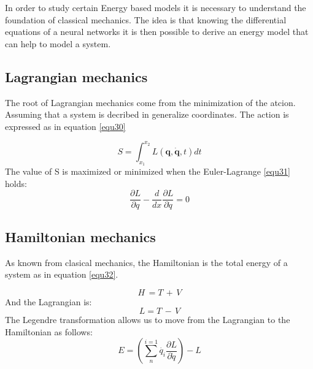 \documentclass[journal]{IEEEtai}
\begin{document}
In order to study certain Energy based models it is necessary to understand the foundation of classical mechanics. The idea is that knowing the differential equations of a neural networks it is then possible to derive an energy model that can help to model a system.

\subsection{Lagrangian mechanics}

The root of Lagrangian mechanics come from the minimization of the atcion. Assuming that a system is decribed in generalize coordinates. The action is expressed as in equation \eqref{equ30}

\begin{equation}\label{equ30}
S = \int_{x_{1}}^{x_{2}}L(\textbf{q},\dot{\textbf{q}},t)dt
\end{equation}
The value of S is maximized or minimized when the Euler-Lagrange \eqref{equ31} holds:
\begin{equation}\label{equ31}
\frac{\partial L}{\partial q}- \frac{d}{dx}\frac{\partial L}{\partial\dot{q}}=0
\end{equation}

\subsection{Hamiltonian mechanics}

As known from clasical mechanics, the Hamiltonian is the total energy of a system as in equation \eqref{equ32}.

\begin{equation}\label{equ32}
H\,= T\, +\, V
\end{equation}
And the Lagrangian is:
\begin{equation}\label{equ33}
L = T\, -\, V
\end{equation}
The Legendre transformation allows us to move from the Lagrangian to the Hamiltonian as follows:
\begin{equation}\label{equ34}
E = \left ( \sum_{n}^{i=1}\dot{q_{i}}\frac{\partial L}{\partial \dot{q}} \right )-L
\end{equation}
\end{document}
